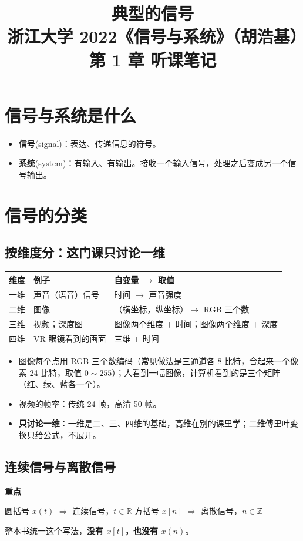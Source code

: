 \documentclass[UTF8,a4paper,11pt]{ctexart}
\title{典型的信号\\\large 浙江大学 2022《信号与系统》（胡浩基）第 1 章 听课笔记}
\author{}
\date{}
\newenvironment{remember}{\begin{rememberbox}\textbf{重点}\par\smallskip}{\end{rememberbox}}
\newcounter{ex}[section]
\begin{document}
\pagestyle{plain}
\maketitle

\section{信号与系统是什么}
\begin{itemize}
\item \textbf{信号}(signal)：表达、传递信息的符号。
\item \textbf{系统}(system)：有输入、有输出。接收一个输入信号，处理之后变成另一个信号输出。
\end{itemize}

\section{信号的分类}

\subsection{按维度分：这门课只讨论一维}
\begin{tabular}{@{}lll@{}}
\toprule
维度 & 例子 & 自变量 $\to$ 取值 \\
\midrule
一维 & 声音（语音）信号 & 时间 $\to$ 声音强度 \\
二维 & 图像 & （横坐标，纵坐标）$\to$ RGB 三个数 \\
三维 & 视频；深度图 & 图像两个维度 $+$ 时间；图像两个维度 $+$ 深度 \\
四维 & VR 眼镜看到的画面 & 三维 $+$ 时间 \\
\bottomrule
\end{tabular}

\medskip
\begin{itemize}[nosep]
\item 图像每个点用 RGB 三个数编码（常见做法是三通道各 8 比特，合起来一个像素 24 比特，取值 $0\sim255$）；人看到一幅图像，计算机看到的是三个矩阵（红、绿、蓝各一个）。
\item 视频的帧率：传统 24 帧，高清 50 帧。
\item \textbf{只讨论一维}：一维是二、三、四维的基础，高维在别的课里学；二维傅里叶变换只给公式，不展开。
\end{itemize}

\subsection{连续信号与离散信号}
\begin{remember}
\begin{center}
圆括号 $x(t)$ $\Rightarrow$ 连续信号，$t\in\mathbb{R}$\qquad\qquad
方括号 $x[n]$ $\Rightarrow$ 离散信号，$n\in\mathbb{Z}$
\end{center}
整本书统一这个写法，\textbf{没有 $x[t]$，也没有 $x(n)$}。
\end{remember}
\end{document}
